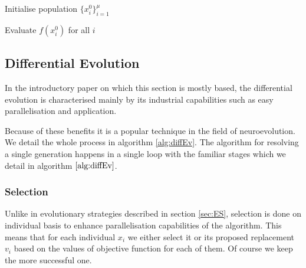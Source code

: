 \begin{algorithm}[h]
	
	\caption{Evolutionary Strategy $  \mu + \lambda $}
	\label{alg:lambdaPlus}
	\SetAlgoNoEnd
	Initialise population $\{x_i^0\}_{i=1}^\mu$\;
	
	Evaluate $f(x_i^0)$ for all $i$\;
\end{algorithm}






\subsection{Differential Evolution}
In the introductory paper \cite{diffEV} on which this section is mostly based, the differential evolution is characterised mainly by its industrial capabilities such as easy parallelisation and application.

Because of these benefits it is a popular technique in the field of neuroevolution.
We detail the whole process in algorithm \ref{alg:diffEv}.
The algorithm for resolving a single generation happens in a single loop with the familiar stages which we detail in algorithm $ \ref{alg:diffEv} $.
\subsubsection{Selection}
Unlike in evolutionary strategies described in  section \ref{sec:ES}, selection is done on individual basis to enhance parallelisation capabilities of the algorithm. This means that for each individual $ x_i $ we either select it or its proposed replacement $ v_i $ based on the values of objective function for each of them. Of course we keep the more successful one. 

